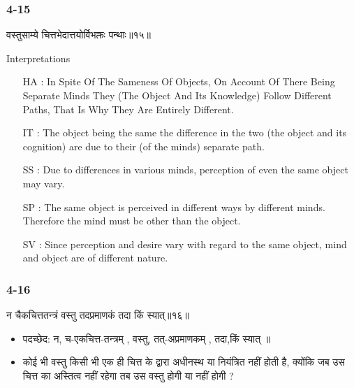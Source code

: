 \begin{frame}[fragile]\frametitle{4-15}
\begin{sanskrit}
वस्तुसाम्ये चित्तभेदात्तयोर्विभक्तः पन्थाः॥१५॥
\end{sanskrit}

Interpretations
\begin{itemize}	
\item [HA]: In Spite Of The Sameness Of Objects, On Account Of There Being Separate Minds They (The Object And Its Knowledge) Follow Different Paths, That Is Why They Are Entirely Different.
\item [IT]: The object being the same the difference in the two (the object and its cognition) are due to their (of the minds) separate path.
\item [SS]: Due to differences in various minds, perception of even the same object may vary.
\item [SP]: The same object is perceived in different ways by different minds. Therefore the mind must be other than the object.
\item [SV]: Since perception and desire vary with regard to the same object, mind and object are of different nature. 
\end{itemize}
\end{frame}


\begin{frame}[fragile]\frametitle{4-16}
\begin{sanskrit}
न चैकचित्ततन्त्रं वस्तु तदप्रमाणकं तदा किं स्यात्॥१६॥
\end{sanskrit}

\begin{itemize}
\item पदच्छेद:  न, च-एकचित्त-तन्त्रम् , वस्तु, तत्-अप्रमाणकम् , तदा,किं‌ ‌स्यात् ॥
\item कोई भी वस्तु किसी भी एक ही चित्त के द्वारा अधीनस्थ या नियंत्रित नहीं होती है, क्योंकि जब उस चित्त का अस्तित्व नहीं रहेगा तब उस वस्तु होगी या नहीं होगी ?
\end{itemize}
\end{frame}


